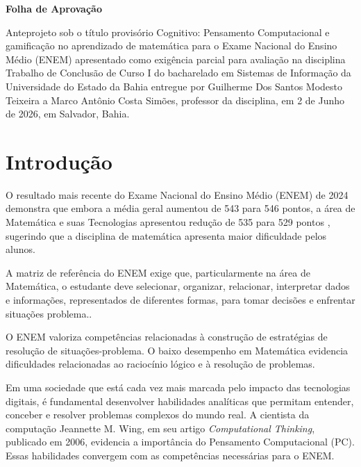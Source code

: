 \documentclass{abnt}
\date{2 de junho de 2026}
\begin{document}
\capa
\folhaderosto

\begin{folhadeaprovacao}
\begin{center}
    \large
    \textbf{Folha de Aprovação}
\end{center}

Anteprojeto sob o título provisório Cognitivo: Pensamento Computacional e
gamificação no aprendizado de matemática para o Exame Nacional do Ensino Médio
(ENEM) apresentado como exigência parcial para avaliação na disciplina Trabalho
de Conclusão de Curso I do bacharelado em Sistemas de Informação da Universidade
do Estado da Bahia entregue por Guilherme Dos Santos Modesto Teixeira a Marco
Antônio Costa Simões, professor da disciplina, em 2 de Junho de 2026, em
Salvador, Bahia. 
\setlength{\ABNTsignthickness}{0.4pt}
\setlength{\ABNTsignskip}{2cm}
\hspace*{1cm}
\hspace*{1cm}
\end{folhadeaprovacao}



\sumario

\chapter{Introdução}
O resultado mais recente do Exame Nacional do Ensino Médio (ENEM) de 2024
demonstra que embora a média geral aumentou de 543 para 546 pontos, a área de
Matemática e suas Tecnologias apresentou redução de 535 para 529 pontos
\cite{inep2025enem}, sugerindo que a disciplina de matemática apresenta maior
dificuldade pelos alunos.

A matriz de referência do ENEM exige que, particularmente na área de Matemática,
o estudante deve selecionar, organizar, relacionar, interpretar dados e
informações, representados de diferentes formas, para tomar decisões e enfrentar
situações problema.\cite{matriz_enem}. 

O ENEM valoriza competências relacionadas à construção de estratégias de
resolução de situações-problema. O baixo desempenho em Matemática evidencia
dificuldades relacionadas ao raciocínio lógico e à resolução de problemas.

Em uma sociedade que está cada vez mais marcada pelo impacto das tecnologias
digitais, é fundamental desenvolver habilidades analíticas que permitam
entender, conceber e resolver problemas complexos do mundo real. A cientista da
computação Jeannette M. Wing, em seu artigo \textit{Computational Thinking},
publicado em 2006, evidencia a importância do Pensamento Computacional (PC).
Essas habilidades convergem com as competências necessárias para o ENEM.
\end{document}
